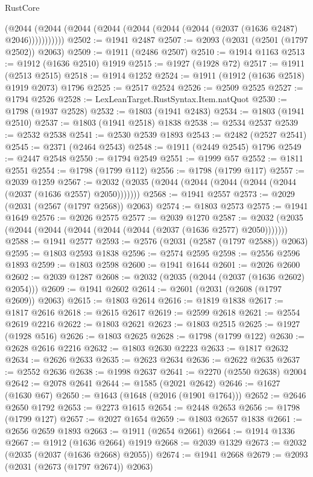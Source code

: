 \begin{lexlean}{RustCore}
\begin{coremodule}
          (@2044 (@2044 (@2044 (@2044 (@2044 (@2044 (@2044 (@2037 (@1636 @2487) @2046)))))))))))
@2502 := @1941 @2487
@2507 := @2093 (@2031 (@2501 (@1797 @2502)) @2063)
@2509 := @1911 (@2486 @2507)
@2510 := @1914 @1163
@2513 := @1912 (@1636 @2510) @1919
@2515 := @1927 (@1928 @72)
@2517 := @1911 (@2513 @2515)
@2518 := @1914 @1252
@2524 := @1911 (@1912 (@1636 @2518) @1919 @2073) @1796
@2525 := @2517 @2524
@2526 := @2509 @2525
@2527 := @1794 @2526
@2528 := LexLeanTarget.RustSyntax.Item.natQuot
@2530 := @1798 (@1937 @2528)
@2532 := @1803 (@1941 @2483)
@2534 := @1803 (@1941 @2510)
@2537 := @1803 (@1941 @2518) @1838
@2538 := @2534 @2537
@2539 := @2532 @2538
@2541 := @2530 @2539 @1893
@2543 := @2482 (@2527 @2541)
@2545 := @2371 (@2464 @2543)
@2548 := @1911 (@2449 @2545) @1796
@2549 := @2447 @2548
@2550 := @1794 @2549
@2551 := @1999 @57
@2552 := @1811 @2551
@2554 := @1798 (@1799 @112)
@2556 := @1798 (@1799 @117)
@2557 := @2039 @1259
@2567 := @2032 (@2035 (@2044 (@2044 (@2044 (@2044 (@2044 (@2037 (@1636 @2557) @2050)))))))
@2568 := @1941 @2557
@2573 := @2029 (@2031 (@2567 (@1797 @2568)) @2063)
@2574 := @1803 @2573
@2575 := @1941 @1649
@2576 := @2026 @2575
@2577 := @2039 @1270
@2587 := @2032 (@2035 (@2044 (@2044 (@2044 (@2044 (@2044 (@2037 (@1636 @2577) @2050)))))))
@2588 := @1941 @2577
@2593 := @2576 (@2031 (@2587 (@1797 @2588)) @2063)
@2595 := @1803 @2593 @1838
@2596 := @2574 @2595
@2598 := @2556 @2596 @1893
@2599 := @1803 @2598
@2600 := @1941 @1644
@2601 := @2026 @2600
@2602 := @2039 @1287
@2608 := @2032 (@2035 (@2044 (@2037 (@1636 @2602) @2054)))
@2609 := @1941 @2602
@2614 := @2601 (@2031 (@2608 (@1797 @2609)) @2063)
@2615 := @1803 @2614
@2616 := @1819 @1838
@2617 := @1817 @2616
@2618 := @2615 @2617
@2619 := @2599 @2618
@2621 := @2554 @2619 @2216
@2622 := @1803 @2621
@2623 := @1803 @2515
@2625 := @1927 (@1928 @516)
@2626 := @1803 @2625
@2628 := @1798 (@1799 @122)
@2630 := @2628 @2616 @2216
@2632 := @1803 @2630 @2223
@2633 := @1817 @2632
@2634 := @2626 @2633
@2635 := @2623 @2634
@2636 := @2622 @2635
@2637 := @2552 @2636
@2638 := @1998 @2637
@2641 := @2270 (@2550 @2638) @2004
@2642 := @2078 @2641
@2644 := @1585 (@2021 @2642)
@2646 := @1627 (@1630 @67)
@2650 := @1643 (@1648 (@2016 (@1901 @1764)))
@2652 := @2646 @2650 @1792
@2653 := @2273 @1615
@2654 := @2448 @2653
@2656 := @1798 (@1799 @127)
@2657 := @2027 @1654
@2659 := @1803 @2657 @1838
@2661 := @2656 @2659 @1893
@2663 := @1911 (@2654 @2661)
@2664 := @1914 @1336
@2667 := @1912 (@1636 @2664) @1919
@2668 := @2039 @1329
@2673 := @2032 (@2035 (@2037 (@1636 @2668) @2055))
@2674 := @1941 @2668
@2679 := @2093 (@2031 (@2673 (@1797 @2674)) @2063)

\end{coremodule}
\end{lexlean}
